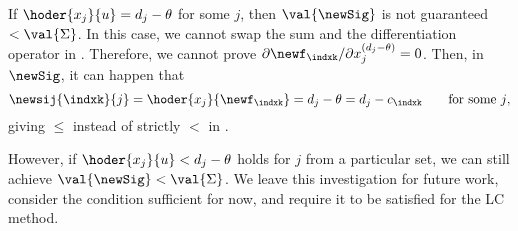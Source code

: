 \begin{remark}\label{rm:suffLC}
If $\hoder{x_j}{u}= d_j-\theta$ for some $j$, then $\val{\newSig}$ is not guaranteed $< \val{\Sigma}$. In this case, we cannot swap the sum and the differentiation operator in . Therefore, we cannot prove $\partial\newf_\indxk / \partial x_j^{(d_j-\theta)}=0$. Then, in $\newSig$, it can happen that
\[
\newsij{\indxk}{j} = \hoder{x_j}{\newf_\indxk}=d_j-\theta = d_j-c_\indxk \qquad \text{for some $j$},
\]
giving $\le$ instead of strictly $<$ in .

However, if $\hoder{x_j}{u}<d_j-\theta$ holds for $j$ from a particular set, we can still achieve $\val{\newSig}<\val{\Sigma}$. We leave this investigation for future work, consider the condition  sufficient for now, and require it to be satisfied for the LC method.
\end{remark}


